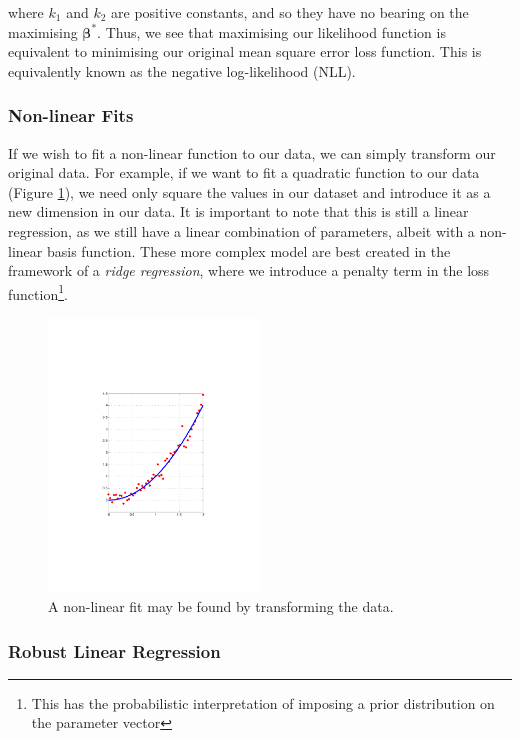\documentclass[11pt]{amsart}
\begin{document}
where $k_1$ and $k_2$ are positive constants, and so they have no bearing on the maximising $\boldsymbol\beta^*$. Thus, we see that maximising our likelihood function is equivalent to minimising our original mean square error loss function. This is equivalently known as the negative log-likelihood (NLL).

\subsubsection{Non-linear Fits}

If we wish to fit a non-linear function to our data, we can simply transform our original data. For example, if we want to fit a quadratic function to our data (Figure \ref{fig:quadraticfit}), we need only square the values in our dataset and introduce it as a new dimension in our data. It is important to note that this is still a linear regression, as we still have a linear combination of parameters, albeit with a non-linear basis function. These more complex model are best created in the framework of a \emph{ridge regression}, where we introduce a penalty term in the loss function\footnote{This has the probabilistic interpretation of imposing a prior distribution on the parameter vector}.

\begin{figure}[!ht]
\centering
\includegraphics[width=0.5\textwidth]{Figures/quadraticfit.pdf}
\caption{A non-linear fit may be found by transforming the data.}
\label{fig:quadraticfit}
\end{figure}

\subsubsection{Robust Linear Regression}
\end{document}
